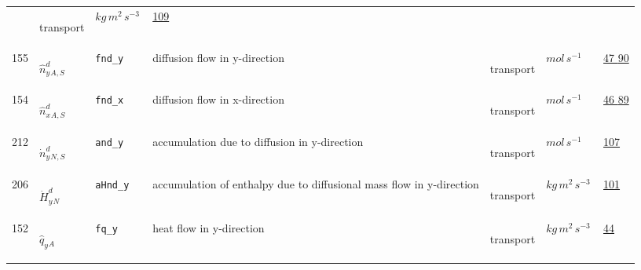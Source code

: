 \begin{longtable}{|p{1cm}|p{2.5cm}|p{4.5cm}|p{8cm}|p{3.0cm}|p{3cm}|p{1cm}|}
             & \begin{lay}transport \end{lay}
             & $ kg \,m^{2} \,s^{-3} \, $
             &                 \hyperlink{"e:109"}{ 109 }
                 \\
            155
             & \hypertarget{"v:155"}{ $ {{\hat{n}^{d}_y}}{_{A, S}} $}
             & \verb|fnd_y|
             & diffusion flow in y-direction
             & \begin{lay}transport \end{lay}
             & $ mol \,s^{-1} \, $
             &                 \hyperlink{"e:47"}{ 47 }
                                 \hyperlink{"e:90"}{ 90 }
                 \\
            154
             & \hypertarget{"v:154"}{ $ {{\hat{n}^{d}_x}}{_{A, S}} $}
             & \verb|fnd_x|
             & diffusion flow in x-direction
             & \begin{lay}transport \end{lay}
             & $ mol \,s^{-1} \, $
             &                 \hyperlink{"e:46"}{ 46 }
                                 \hyperlink{"e:89"}{ 89 }
                 \\
            212
             & \hypertarget{"v:212"}{ $ {{\dot{n}^d_y}}{_{N, S}} $}
             & \verb|and_y|
             & accumulation due to diffusion in y-direction
             & \begin{lay}transport \end{lay}
             & $ mol \,s^{-1} \, $
             &                 \hyperlink{"e:107"}{ 107 }
                 \\
            206
             & \hypertarget{"v:206"}{ $ {{\dot{H}^d_y}}{_{N}} $}
             & \verb|aHnd_y|
             & accumulation of enthalpy due to diffusional mass flow in y-direction
             & \begin{lay}transport \end{lay}
             & $ kg \,m^{2} \,s^{-3} \, $
             &                 \hyperlink{"e:101"}{ 101 }
                 \\
            152
             & \hypertarget{"v:152"}{ $ {{\hat{q}_y}}{_{A}} $}
             & \verb|fq_y|
             & heat flow in y-direction
             & \begin{lay}transport \end{lay}
             & $ kg \,m^{2} \,s^{-3} \, $
             &                 \hyperlink{"e:44"}{ 44 }
                 \\

\end{longtable}
